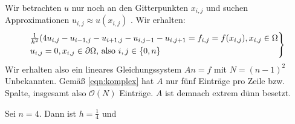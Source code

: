 
Wir betrachten $u$ nur noch an den Gitterpunkten $x_{i,j}$ und suchen Approximationen $u_{i,j} \approx u(x_{i,j})$ . Wir erhalten:
\begin{equation}
	\label{eqn:komplex}
\begin{rcases}
	\frac{1}{h^2}(4u_{i,j} - u_{i-1,j} -u_{i+1,j} -u_{i,j-1} - u_{i,j+1} = f_{i,j} = f(x_{i,j}) , x_{i,j} \in \Omega \\
	u_{i,j} = 0  , x_{i,j} \in \partial \Omega \text{, also } i,j \in \{0,n\}  
\end{rcases}
\end{equation}
Wir erhalten also ein lineares Gleichungssystem $An=f$ mit $N=(n-1)^2$ Unbekannten. Gemäß \eqref{eqn:komplex} hat $A$ nur fünf Einträge pro Zeile bzw. Spalte, insgesamt also $\mathcal{O}(N)$ Einträge. 
$A$ ist demnach extrem dünn besetzt.
\begin{example}
	\label{eg:löser1}
Sei $n=4$. Dann ist $h=\frac{1}{4}$ und 

\end{example}

